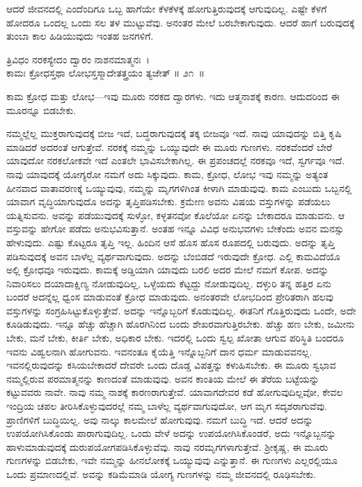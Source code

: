 ಆದರೆ ಜೀವನದಲ್ಲಿ ಎಂದೆಂದಿಗೂ ಒಬ್ಬ ಹಾಗೆಯೇ ಕೆಳಕೆಳಕ್ಕೆ ಹೋಗುತ್ತಿರುವುದಕ್ಕೆ ಆಗುವುದಿಲ್ಲ. ಎಷ್ಟೇ ಕೆಳಗೆ ಹೋದರೂ ಒಂದಲ್ಲ ಒಂದು ಸಲ ತಳ ಮುಟ್ಟುವೆವು. ಅನಂತರ ಮೇಲೆ ಬರಬೇಕಾಗುವುದು. ಆದರೆ ಹಾಗೆ ಬರುವುದಕ್ಕೆ ತುಂಬಾ ಕಾಲ ಹಿಡಿಯುವುದು ಇಂತಹ ಜನಗಳಿಗೆ.

\begin{shloka}
ತ್ರಿವಿಧಂ ನರಕಸ್ಯೇದಂ ದ್ವಾರಂ ನಾಶನಮಾತ್ಮನಃ~।\\ಕಾಮಃ ಕ್ರೋಧಸ್ತಥಾ ಲೋಭಸ್ತಸ್ಮಾದೇತತ್ತ್ರಯಂ ತ್ಯಜೇತ್ \hfill॥ ೨೧~॥
\end{shloka}

\begin{artha}
ಕಾಮ ಕ್ರೋಧ ಮತ್ತು ಲೋಭ—ಇವು ಮೂರು ನರಕದ ದ್ವಾರಗಳು. ಇದು ಆತ್ಮನಾಶಕ್ಕೆ ಕಾರಣ. ಆದುದರಿಂದ ಈ ಮೂರನ್ನೂ ಬಿಡಬೇಕು.
\end{artha}

ನಮ್ಮಲ್ಲೆಲ್ಲ ಮುಕ್ತರಾಗುವುದಕ್ಕೆ ಬೀಜ ಇದೆ, ಬದ್ಧರಾಗುವುದಕ್ಕೆ ತಕ್ಕ ಬೀಜವೂ ಇದೆ. ನಾವು ಯಾವುದನ್ನು ಬಿತ್ತಿ ಕೃಷಿ ಮಾಡಿದರೆ ಅದರಂತೆ ಆಗುತ್ತೇವೆ. ನರಕಕ್ಕೆ ನಮ್ಮನ್ನು ಒಯ್ಯುವುದೇ ಈ ಮೂರು ಗುಣಗಳು. ನರಕವೆಂದರೆ ಬೇರೆ ಯಾವುದೋ ನರಕಲೋಕವೇ ಇದೆ ಎಂತಲೇ ಭಾವಿಸಬೇಕಾಗಿಲ್ಲ. ಈ ಪ್ರಪಂಚದಲ್ಲೆ ನರಕವೂ ಇದೆ, ಸ್ವರ್ಗವೂ ಇದೆ. ನಾವು ಯಾವುದಕ್ಕೆ ಯೋಗ್ಯರೋ ನಮಗೆ ಅದು ಸಿಕ್ಕುವುದು. ಕಾಮ, ಕ್ರೋಧ, ಲೋಭ ಇವು ನಮ್ಮನ್ನು ಅತ್ಯಂತ ಹೀನವಾದ ವಾತಾವರಣಕ್ಕೆ ಒಯ್ಯುವುವು, ನಮ್ಮನ್ನು ಮೃಗಗಳಿಗಿಂತ ಕೀಳಾಗಿ ಮಾಡುವುವು. ಕಾಮ ಎಂಬುದು ಒಬ್ಬನಲ್ಲಿ ಯಾವಾಗ ವೃದ್ಧಿಯಾಗುವುದೊ ಅದನ್ನು ತೃಪ್ತಿಪಡಿಸಬೇಕು. ಕ್ರಮೇಣ ಅವನು ವಿಷಯ ವಸ್ತುಗಳನ್ನು ಪಡೆಯಲು ಯತ್ನಿಸುವನು. ಅವನ್ನು ಪಡೆಯುವುದಕ್ಕೆ ಸುಳ್ಳೋ, ಕಳ್ಳತನವೋ ಕೊಲೆಯೋ ಏನನ್ನು ಬೇಕಾದರೂ ಮಾಡುವನು. ಆ ವಸ್ತುವನ್ನು ಹೇಗೋ ಪಡೆದು ಅನುಭವಿಸುತ್ತಾನೆ. ಅಂತಹ ಇನ್ನೂ ವಿವಿಧ ಅನುಭವಗಳು ಬೇಕೆಂದು ಅವನ ಮನಸ್ಸು ಹೇಳುವುದು. ಎಷ್ಟು ಕೊಟ್ಟರೂ ತೃಪ್ತಿ ಇಲ್ಲ. ಹಿಂದಿನ ಆಸೆ ಹೊಸ ಹೊಸ ರೂಪದಲ್ಲಿ ಬರುವುದು. ಅದನ್ನು ತೃಪ್ತಿ ಪಡಿಸುವುದಕ್ಕೆ ಅವನ ಬಾಳೆಲ್ಲ ವ್ಯರ್ಥವಾಗುವುದು. ಅದನ್ನು ಬೆಂಬಿಡದೆ ಇರುವುದೇ ಕ್ರೋಧ. ಎಲ್ಲಿ ಕಾಮವಿದೆಯೊ ಅಲ್ಲಿ ಕ್ರೋಧವೂ ಇರುವುದು. ಕಾಮಕ್ಕೆ ಅಡ್ಡಿಯಾಗಿ ಯಾವುದು ಬರಲಿ ಅದರ ಮೇಲೆ ನಮಗೆ ಕೋಪ. ಅದನ್ನು ನಿವಾರಿಸಲು ದಯಾದಾಕ್ಷಿಣ್ಯ ನೋಡುವುದಿಲ್ಲ, ಒಳ್ಳೆಯದು ಕೆಟ್ಟದ್ದು ನೋಡುವುದಿಲ್ಲ. ದಳ್ಳುರಿ ತನ್ನ ಹತ್ತಿರ ಏನು ಬಂದರೆ ಅದನ್ನೆಲ್ಲ ಧ್ವಂಸ ಮಾಡುವಂತೆ ಕ್ರೋಧ ಮಾಡುವುದು. ಅನಂತರವೇ ಲೋಭದಿಂದ ಪ್ರೇರಿತರಾಗಿ ಹಲವು ವಸ್ತುಗಳನ್ನು ಸಂಗ್ರಹಿಸಿಟ್ಟುಕೊಳ್ಳುತ್ತೇವೆ. ಅದನ್ನು ಇನ್ನೊಬ್ಬರಿಗೆ ಕೊಡುವುದಿಲ್ಲ. ಈತನಿಗೆ ಗೊತ್ತಿರುವುದು ಒಂದೇ, ಅದೇ ಕೂಡಿಡುವುದು. ಇನ್ನೂ ಹೆಚ್ಚು ಹೆಚ್ಚಾಗಿ ಹೊರಗಿನಿಂದ ಬಂದು ಶೇಖರವಾಗುತ್ತಿರಬೇಕು. ಹೆಚ್ಚು ಹಣ ಬೇಕು, ಜಮೀನು ಬೇಕು, ಮನೆ ಬೇಕು, ಕೀರ್ತಿ ಬೇಕು, ಅಧಿಕಾರ ಬೇಕು. ಇದರಲ್ಲಿ ಒಂದು ಸ್ವಲ್ಪ ಖೋತಾ ಆಗುವ ಪರಿಸ್ಥಿತಿ ಬಂದರೂ ಇವನು ವಿಹ್ವಲನಾಗಿ ಹೋಗುವನು. ಇವನಂತೂ ಕೈಯೆತ್ತಿ ಇನ್ನೊಬ್ಬನಿಗೆ ದಾನ ಧರ್ಮ ಮಾಡುವವನಲ್ಲ. ಇವನಲ್ಲಿರುವುದನ್ನು ಕಸಿಯಬೇಕಾದರೆ ದೇವರೇ ಒಂದು ದೊಡ್ಡ ವಿಪತ್ತನ್ನು ಕಳುಹಿಸಬೇಕು. ಈ ಮೂರು ಸ್ವಭಾವ ನಮ್ಮಲ್ಲಿರುವ ಪರಮಾತ್ಮನನ್ನು ಕಾಣದಂತೆ ಮಾಡುವುವು. ಅವನ ಕಾಂತಿಯ ಮೇಲೆ ಈ ತೆರೆಯ ಬಟ್ಟೆಯನ್ನು ಕಟ್ಟುವವರು ನಾವೇ. ನಾವು ನಮ್ಮ ನಾಶಕ್ಕೆ ಕಾರಣರಾಗುತ್ತೇವೆ. ಯಾವಾಗ\break ದೇವರ ಕಡೆ ಹೋಗುವುದಿಲ್ಲವೋ, ಕೇವಲ ಇಂದ್ರಿಯ ಚಪಲ ತೀರಿಸಿಕೊಳ್ಳುವುದರಲ್ಲೆ ನಮ್ಮ ಬಾಳೆಲ್ಲ ವ್ಯರ್ಥವಾಗುವುದೋ, ಆಗ ಮೃಗ ಸದೃಶರಾಗುವೆವು. ಪ್ರಾಣಿಗಳಿಗೆ ಬುದ್ಧಿಯಿಲ್ಲ. ಅವು ನಾಲ್ಕು ಕಾಲಮೇಲೆ ಹೋಗುವುವು. ನಮಗೆ ಬುದ್ಧಿ ಇದೆ. ಆದರೆ ಅದನ್ನು ಉಪಯೋಗಿಸಿಕೊಂಡು ಪಾರಾಗುವುದಿಲ್ಲ. ಒಂದು ವೇಳೆ ಅದನ್ನು ಉಪಯೋಗಿಸಿಕೊಂಡರೆ, ಅದು ಇನ್ನೊಬ್ಬನನ್ನು ಹಾಳುಮಾಡುವುದಕ್ಕೆ ದುರುಪಯೋಗಪಡಿಸಿಕೊಳ್ಳುವೆವು. ನಾವು ನರಮೃಗಗಳಾಗುತ್ತೇವೆ. ಶ‍್ರೀಕೃಷ್ಣ, ಈ ಮೂರು ಗುಣಗಳನ್ನು ಬಿಡಬೇಕು, ಇವೇ ನಮ್ಮನ್ನು ಹೀನಲೋಕಕ್ಕೆ ಒಯ್ಯುವುವು ಎನ್ನುತ್ತಾನೆ. ಈ ಗುಣಗಳು ಎಲ್ಲರಲ್ಲಿಯೂ ಒಂದು ಪ್ರಮಾಣದಲ್ಲಿವೆ. ಅವನ್ನು ಕಡಿಮೆಮಾಡಿ ಯೋಗ್ಯ ಗುಣಗಳನ್ನು ನಮ್ಮ ಜೀವನದಲ್ಲಿ ರೂಢಿಸಬೇಕು.

